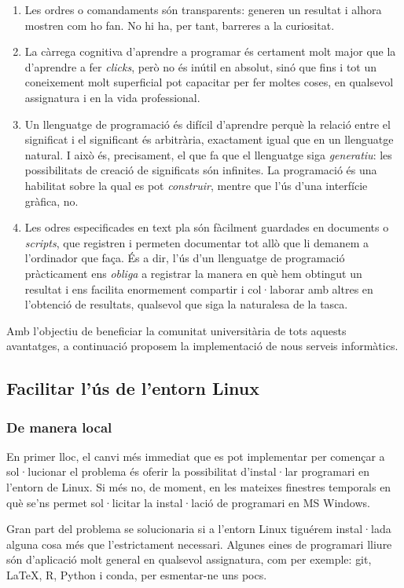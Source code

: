 \documentclass[a4paper,12pt]{article}
\begin{document}
\begin{enumerate}
\item Les ordres o comandaments són transparents: generen un resultat i alhora mostren
com ho fan. No hi ha, per tant, barreres a la curiositat.
\item La càrrega cognitiva d'aprendre a programar és certament molt major que la d'aprendre a fer
\emph{clicks}, però no és inútil en absolut, sinó que fins i tot un coneixement molt
superficial pot capacitar per fer moltes coses, en qualsevol assignatura i en la
vida professional.
\item Un llenguatge de programació és difícil d'aprendre perquè la relació entre el
significat i el significant és arbitrària, exactament igual que en un llenguatge natural. I això és,
precisament, el que fa que el llenguatge siga \emph{generatiu}: les possibilitats de creació
de significats són infinites. La programació és una habilitat sobre la qual es pot \emph{construir},
mentre que l'ús d'una interfície gràfica, no.
\item Les odres especificades en text pla són fàcilment guardades en documents o \emph{scripts},
que registren i permeten documentar tot allò que li demanem a l'ordinador que faça. És a dir,
l'ús d'un llenguatge de programació pràcticament ens \emph{obliga} a registrar la manera en què
hem obtingut un resultat i ens facilita enormement compartir i col·laborar amb altres en
l'obtenció de resultats, qualsevol que siga la naturalesa de la tasca.
\end{enumerate}

Amb l'objectiu de beneficiar la comunitat universitària de tots aquests avantatges, 
a continuació proposem la implementació de nous serveis informàtics.

\subsection{Facilitar l'ús de l'entorn Linux}
\subsubsection{De manera local}
En primer lloc, el canvi més immediat que es pot implementar per començar a sol·lucionar el
problema és oferir la possibilitat d'instal·lar programari en l'entorn de Linux. Si més no,
de moment, en les mateixes finestres temporals en què se'ns permet sol·licitar la instal·lació
de programari en MS Windows.

Gran part del problema se solucionaria si a l'entorn Linux tiguérem instal·lada alguna cosa
més que l'estrictament necessari. Algunes eines de programari lliure són d'aplicació molt
general en qualsevol assignatura, com per exemple: \textsf{git}, \LaTeX, \textsf{R}, Python
i conda, per esmentar-ne uns pocs.
\end{document}
